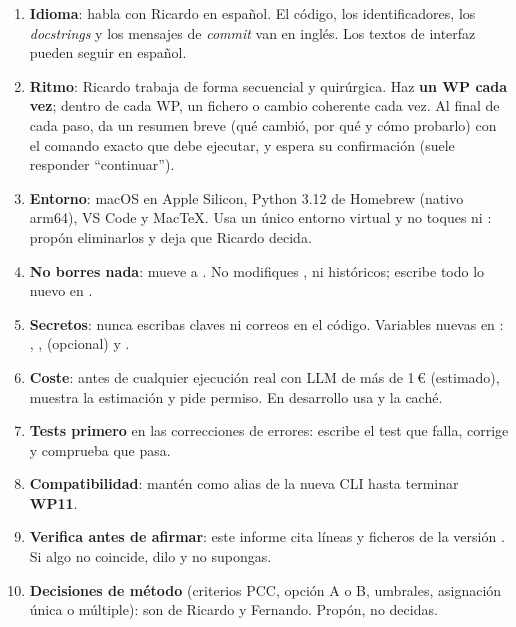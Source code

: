 \documentclass[11pt,a4paper]{article}
\newcommand{\WP}[1]{\textbf{\textcolor{palet}{WP#1}}}
\begin{document}
\begin{agente}
\begin{enumerate}[leftmargin=*]
  \item \textbf{Idioma}: habla con Ricardo en español. El código, los identificadores, los \emph{docstrings} y los mensajes de \emph{commit} van en inglés. Los textos de interfaz pueden seguir en español.
  \item \textbf{Ritmo}: Ricardo trabaja de forma secuencial y quirúrgica. Haz \textbf{un WP cada vez}; dentro de cada WP, un fichero o cambio coherente cada vez. Al final de cada paso, da un resumen breve (qué cambió, por qué y cómo probarlo) con el comando exacto que debe ejecutar, y espera su confirmación (suele responder ``continuar'').
  \item \textbf{Entorno}: macOS en Apple Silicon, Python 3.12 de Homebrew (nativo arm64), VS Code y MacTeX. Usa un único entorno virtual  y no toques  ni : propón eliminarlos y deja que Ricardo decida.
  \item \textbf{No borres nada}: mueve a . No modifiques ,  ni  históricos; escribe todo lo nuevo en .
  \item \textbf{Secretos}: nunca escribas claves ni correos en el código. Variables nuevas en : , ,  (opcional) y .
  \item \textbf{Coste}: antes de cualquier ejecución real con LLM de más de 1\,€ (estimado), muestra la estimación y pide permiso. En desarrollo usa  y la caché.
  \item \textbf{Tests primero} en las correcciones de errores: escribe el test que falla, corrige y comprueba que pasa.
  \item \textbf{Compatibilidad}: mantén  como alias de la nueva CLI hasta terminar \WP{11}.
  \item \textbf{Verifica antes de afirmar}: este informe cita líneas y ficheros de la versión . Si algo no coincide, dilo y no supongas.
  \item \textbf{Decisiones de método} (criterios PCC, opción A o B, umbrales, asignación única o múltiple): son de Ricardo y Fernando. Propón, no decidas.
\end{enumerate}
\end{agente}
\end{document}
